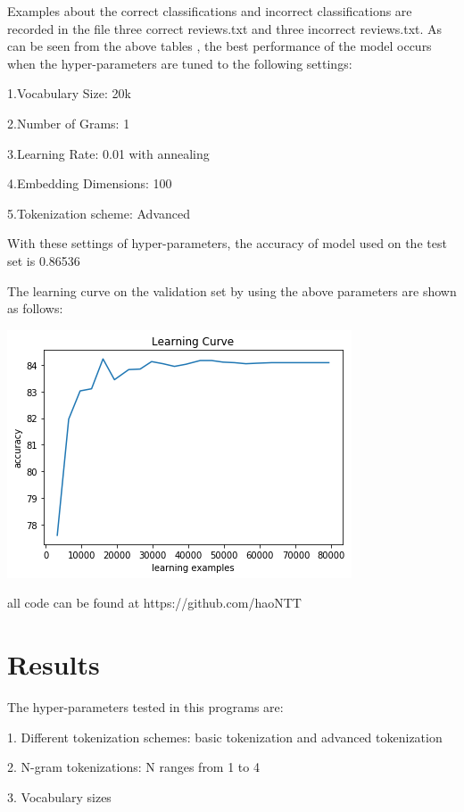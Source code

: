 \documentclass{article}
\begin{document}
Examples about the correct classifications and incorrect classifications are recorded in the file three correct reviews.txt and three incorrect reviews.txt. 
As can be seen from the above tables , the best performance of the model occurs when the hyper-parameters are tuned to the following settings:

1.Vocabulary Size: 20k 

2.Number of Grams: 1

3.Learning Rate: 0.01 with annealing

4.Embedding Dimensions: 100

5.Tokenization scheme: Advanced 

With these settings of hyper-parameters, the accuracy of model used on the test set is 0.86536

The learning curve on the validation set by using the above parameters are shown as follows:

\includegraphics{learning_curve.png}

all code can be found at https://github.com/haoNTT 

\section*{Results} %

The hyper-parameters tested in this programs are: 

1. Different tokenization schemes: basic tokenization and advanced tokenization

2. N-gram tokenizations: N ranges from 1 to 4

3. Vocabulary sizes 
\end{document}
